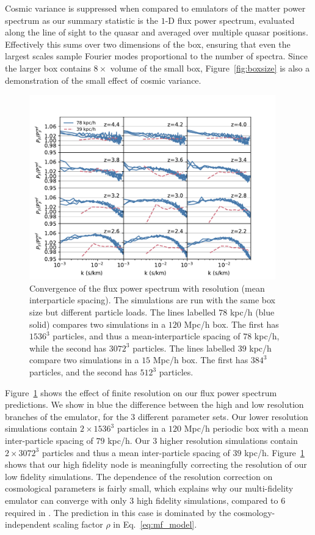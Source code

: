 \documentclass[a4paper,11pt]{article}
\begin{document}
Cosmic variance is suppressed when compared to emulators of the matter power spectrum as our summary statistic is the $1$-D flux power spectrum, evaluated along the line of sight to the quasar and averaged over multiple quasar positions. Effectively this sums over two dimensions of the box, ensuring that even the largest scales sample Fourier modes proportional to the number of spectra. Since the larger box contains $8\times$ volume of the small box, Figure~\ref{fig:boxsize} is also a demonstration of the small effect of cosmic variance.

\begin{figure}
\includegraphics[width=0.95\textwidth,trim={0 0 1cm 0},clip]{figures/resolution-convergence.pdf}
 \caption{Convergence of the flux power spectrum with resolution (mean interparticle spacing). The simulations are run with the same box size but different particle loads. The lines labelled $78$ kpc/h (blue solid) compares two simulations in a $120$ Mpc/h box. The first has $1536^3$ particles, and thus a mean-interparticle spacing of $78$ kpc/h, while the second has $3072^3$ particles. The lines labelled $39$ kpc/h compare two simulations in a $15$ Mpc/h box. The first has $384^3$ particles, and the second has $512^3$ particles.}
 \label{fig:resolution}
\end{figure}

Figure~\ref{fig:resolution} shows the effect of finite resolution on our flux power spectrum predictions. We show in blue the difference between the high and low resolution branches of the emulator, for the $3$ different parameter sets. Our lower resolution simulations contain $2\times 1536^3$ particles in a $120$ Mpc/h periodic box with a mean inter-particle spacing of $79$ kpc/h. Our $3$ higher resolution simulations contain $2\times 3072^3$ particles and thus a mean inter-particle spacing of $39$ kpc/h. Figure~\ref{fig:resolution} shows that our high fidelity node is meaningfully correcting the resolution of our low fidelity simulations. The dependence of the resolution correction on cosmological parameters is fairly small, which explains why our multi-fidelity emulator can converge with only $3$ high fidelity simulations, compared to $6$ required in \cite{Fernandez:2022}. The prediction in this case is dominated by the cosmology-independent scaling factor $\rho$ in Eq.~\ref{eq:mf_model}.
\end{document}
